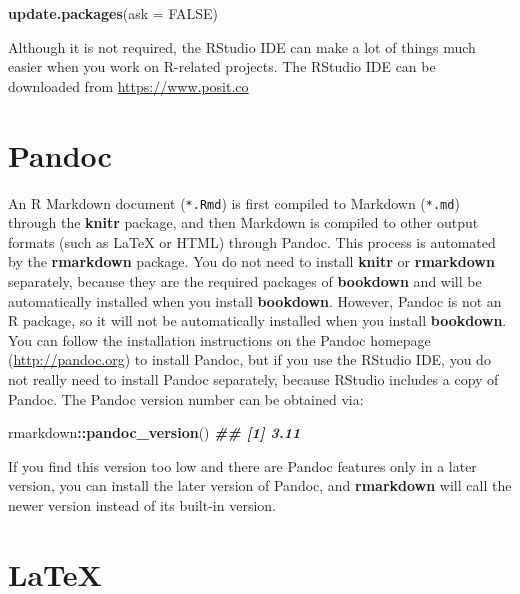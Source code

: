 \documentclass[
  12pt,
]{krantz}
\newenvironment{Shaded}{\begin{snugshade}}{\end{snugshade}}
\newcommand{\AttributeTok}[1]{\textcolor[rgb]{0.13,0.29,0.53}{#1}}
\newcommand{\ConstantTok}[1]{\textcolor[rgb]{0.56,0.35,0.01}{#1}}
\newcommand{\DocumentationTok}[1]{\textcolor[rgb]{0.56,0.35,0.01}{\textbf{\textit{#1}}}}
\newcommand{\FunctionTok}[1]{\textcolor[rgb]{0.13,0.29,0.53}{\textbf{#1}}}
\newcommand{\NormalTok}[1]{#1}
\newcommand{\SpecialCharTok}[1]{\textcolor[rgb]{0.81,0.36,0.00}{\textbf{#1}}}
\theoremstyle{definition}
\theoremstyle{definition}
\theoremstyle{definition}
\theoremstyle{definition}
\theoremstyle{remark}
\begin{document}
\begin{Shaded}
\begin{Highlighting}[]
\FunctionTok{update.packages}\NormalTok{(}\AttributeTok{ask =} \ConstantTok{FALSE}\NormalTok{)}
\end{Highlighting}
\end{Shaded}

Although it is not required, the RStudio IDE can make a lot of things much easier when you work on R-related projects. The RStudio IDE can be downloaded from \url{https://www.posit.co}

\section{Pandoc}\label{pandoc}

An R Markdown document (\texttt{*.Rmd}) is first compiled to Markdown (\texttt{*.md}) through the \textbf{knitr} package, and then Markdown is compiled to other output formats (such as LaTeX or HTML) through Pandoc. This process is automated by the \textbf{rmarkdown} package. You do not need to install \textbf{knitr} or \textbf{rmarkdown} separately, because they are the required packages of \textbf{bookdown} and will be automatically installed when you install \textbf{bookdown}. However, Pandoc is not an R package, so it will not be automatically installed when you install \textbf{bookdown}. You can follow the installation instructions on the Pandoc homepage (\url{http://pandoc.org}) to install Pandoc, but if you use the RStudio IDE, you do not really need to install Pandoc separately, because RStudio includes a copy of Pandoc. The Pandoc version number can be obtained via:

\begin{Shaded}
\begin{Highlighting}[]
\NormalTok{rmarkdown}\SpecialCharTok{::}\FunctionTok{pandoc\_version}\NormalTok{()}
\DocumentationTok{\#\# [1] \textquotesingle{}3.11\textquotesingle{}}
\end{Highlighting}
\end{Shaded}

If you find this version too low and there are Pandoc features only in a later version, you can install the later version of Pandoc, and \textbf{rmarkdown} will call the newer version instead of its built-in version.

\section{LaTeX}\label{latex}
\end{document}
